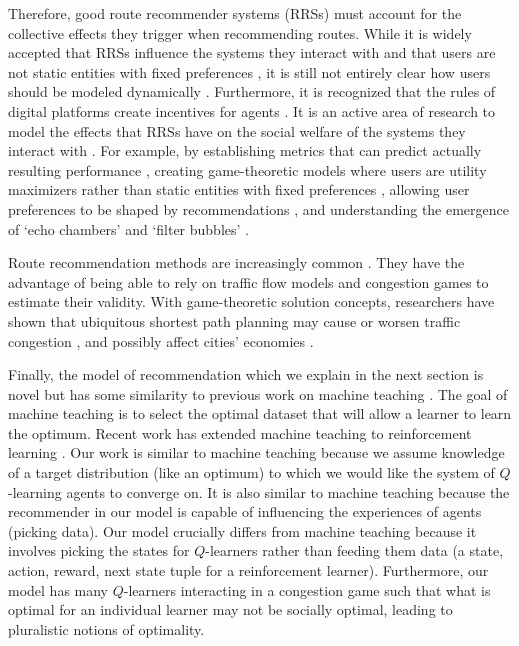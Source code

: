 Therefore, good route recommender systems (RRSs) must account for the collective effects they trigger when recommending routes. While it is widely accepted that RRSs influence the systems they interact with and that users are not static entities with fixed preferences \cite{Nguyen2014, Stocker2020, Stray2020, stray2021you, stray2021designing, Hazrati2022}, it is still not entirely clear how users should be modeled dynamically \cite{jiang2019degenerate, chen2019generative, kalimeris2021preference}. Furthermore, it is recognized that the rules of digital platforms create incentives for agents \cite{benporat2018gametheoretic, hron2023modeling}. It is an active area of research to model the effects that RRSs have on the social welfare of the systems they interact with \cite{helbing2004dynamic}. For example, by establishing metrics that can predict actually resulting performance \cite{krauth2020offline}, creating game-theoretic models where users are utility maximizers rather than static entities with fixed preferences \cite{chen2019generative}, allowing user preferences to be shaped by recommendations \cite{kalimeris2021preference}, and understanding the emergence of `echo chambers' and `filter bubbles' \cite{jiang2019degenerate}. 

Route recommendation methods are increasingly common \cite{su2014crowdplanner, cui2018personalized, su2009survey}. They have the advantage of being able to rely on traffic flow models and congestion games to estimate their validity. With game-theoretic solution concepts, researchers have shown that ubiquitous shortest path planning may cause or worsen traffic congestion \cite{thai2016negative, cabannes2017impact, macfarlane2019apps}, and possibly affect cities' economies \cite{sweet2011does}. 

Finally, the model of recommendation which we explain in the next section is novel but has some similarity to previous work on machine teaching \cite{zhu2015machine, zhu2018overview}. The goal of machine teaching is to select the optimal dataset that will allow a learner to learn the optimum. Recent work has extended machine teaching to reinforcement learning \cite{lewandowski2022reinforcement}. Our work is similar to machine teaching because we assume knowledge of a target distribution (like an optimum) to which we would like the system of $Q$-learning agents to converge on. It is also similar to machine teaching because the recommender in our model is capable of influencing the experiences of agents (picking data). Our model crucially differs from machine teaching because it involves picking the states for $Q$-learners rather than feeding them data (a state, action, reward, next state tuple for a reinforcement learner). Furthermore, our model has many $Q$-learners interacting in a congestion game such that what is optimal for an individual learner may not be socially optimal, leading to pluralistic notions of optimality.